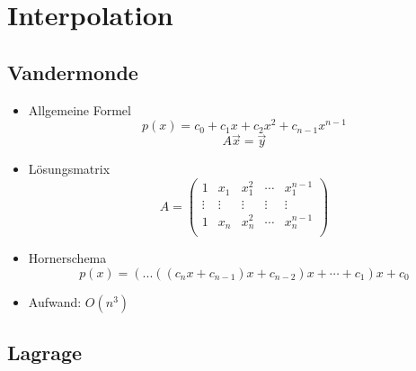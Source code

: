 \section{Interpolation}

\subsection{Vandermonde}

\begin{itemize}

	\item Allgemeine Formel \\
	\begin{equation*}
		p(x) = c_{0} + c_{1}x + c_{2}x^2 + c_{n-1}x^{n-1}
	\end{equation*}
	\begin{equation*}
		A\vec{x} = \vec{y}
	\end{equation*}
	
	\item Lösungsmatrix \\
	\begin{displaymath}
		A = 
		\begin{pmatrix}
			1 		& x_{1} 	& x_{1}^2 	& \cdots	& x_{1}^{n-1} 	\\
			\vdots	& \vdots	& \vdots	& \vdots	&\vdots			\\
			1 		& x_{n} 	& x_{n}^2 	& \cdots	& x_{n}^{n-1} 	\\
		\end{pmatrix}
	\end{displaymath}
	
	\item Hornerschema \\
	\begin{equation*}
		p(x) = (...((c_{n} x + c_{n-1}) x + c_{n-2}) x + \cdots + c_{1}) x + c_{0}
	\end{equation*}
	
	\item Aufwand: $O(n^3)$

\end{itemize}

\subsection{Lagrage}

